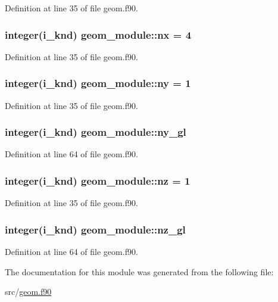 Definition at line 35 of file geom.\-f90.

\hypertarget{classgeom__module_a7a5902416f1d33e2a27620d6c82db061}{
\subsubsection[{nx}]{\setlength{\rightskip}{0pt plus 5cm}integer(i\-\_\-knd) geom\-\_\-module\-::nx = 4}}\label{classgeom__module_a7a5902416f1d33e2a27620d6c82db061}


Definition at line 35 of file geom.\-f90.

\hypertarget{classgeom__module_a38b87580d41ec11b8719f65f06b8b0a3}{
\subsubsection[{ny}]{\setlength{\rightskip}{0pt plus 5cm}integer(i\-\_\-knd) geom\-\_\-module\-::ny = 1}}\label{classgeom__module_a38b87580d41ec11b8719f65f06b8b0a3}


Definition at line 35 of file geom.\-f90.

\hypertarget{classgeom__module_a28abec0d4fe709bc64ee36b68347ce1a}{
\subsubsection[{ny\-\_\-gl}]{\setlength{\rightskip}{0pt plus 5cm}integer(i\-\_\-knd) geom\-\_\-module\-::ny\-\_\-gl}}\label{classgeom__module_a28abec0d4fe709bc64ee36b68347ce1a}


Definition at line 64 of file geom.\-f90.

\hypertarget{classgeom__module_a5f461a2f10c78de302a44c8c70b8fca5}{
\subsubsection[{nz}]{\setlength{\rightskip}{0pt plus 5cm}integer(i\-\_\-knd) geom\-\_\-module\-::nz = 1}}\label{classgeom__module_a5f461a2f10c78de302a44c8c70b8fca5}


Definition at line 35 of file geom.\-f90.

\hypertarget{classgeom__module_a3d237cf21a21064504566ce34b27c848}{
\subsubsection[{nz\-\_\-gl}]{\setlength{\rightskip}{0pt plus 5cm}integer(i\-\_\-knd) geom\-\_\-module\-::nz\-\_\-gl}}\label{classgeom__module_a3d237cf21a21064504566ce34b27c848}


Definition at line 64 of file geom.\-f90.



The documentation for this module was generated from the following file\-:\begin{DoxyCompactItemize}
\item 
src/\hyperlink{geom_8f90}{geom.\-f90}\end{DoxyCompactItemize}
